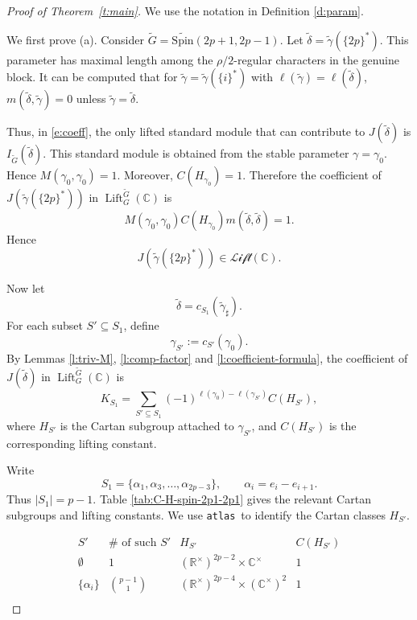 \documentclass{amsart}
\DeclareMathOperator{\Lift}{Lift}
\newcommand{\LLift}{\mathscr{Lift}}
\newcommand{\atlas}{\texttt{atlas}}
\newcommand{\bbC}{{\mathbb{C}}}
\newcommand{\bbR}{{\mathbb R}}
\newcommand{\Spin}{{\mathrm{Spin}}}
\theoremstyle{definition}
\newcommand{\tu}{\widetilde}
\begin{document}
\begin{proof}[Proof of Theorem~\ref{t:main}]
We use the notation in Definition \ref{d:param}.

We first prove (a). Consider $\tu G =\tu\Spin(2p+1,2p-1)$. 
Let
$\tu\delta=\tu\gamma(\{2p\}^*)$.  This parameter has maximal length among the $\rho/2$-regular characters in the
genuine block.  It can be computed that for $\tu\gamma=\tu\gamma(\{i\}^*)$ with $\ell(\tu\gamma)=\ell (\tu\delta)$, $m(\tu\delta,\tu\gamma)=0$ unless $\tu\gamma=\tu\delta$. 




Thus, in \eqref{e:coeff}, the only lifted standard module that can contribute
to $J(\tu\delta)$ is $I_{\tu G}(\tu\delta)$. This standard module is obtained
from the stable parameter $\gamma=\gamma_0$. Hence
$M(\gamma_0,\gamma_0)=1.$
Moreover, 
$C(H_{\gamma_0})=1.$
Therefore the coefficient of
$J(\tu\gamma(\{2p\}^*))$ in $\Lift_G^{\tu G}(\bbC)$ is $$M(\gamma_0,\gamma_0)C(H_{\gamma_0})m(\tu\delta,\tu\delta)=
1.$$
Hence
$$
J(\tu\gamma(\{2p\}^*))
\in \LLift(\bbC).
$$



Now let
\[
\tu\delta=c_{S_1}(\tu\gamma_\sharp).
\]
For each subset \(S'\subseteq S_1\), define
\[
\gamma_{S'}:=c_{S'}(\gamma_0).
\]
By Lemmas \ref{l:triv-M}, \ref{l:comp-factor} and \ref{l:coefficient-formula}, the coefficient of
\(J(\tu\delta)\) in \(\Lift_G^{\tu G}(\bbC)\) is
\begin{equation}\label{e:coeff1}
K_{S_1}
=
\sum_{S'\subseteq S_1}
(-1)^{\ell(\gamma_0)-\ell(\gamma_{S'})}
C(H_{S'}),
\end{equation}
where \(H_{S'}\) is the Cartan subgroup attached to \(\gamma_{S'}\), and
\(C(H_{S'})\) is the corresponding lifting constant.

Write
\[
S_1=\{\alpha_1,\alpha_3,\ldots,\alpha_{2p-3}\},
\qquad
\alpha_i=e_i-e_{i+1}.
\]
Thus \(|S_1|=p-1\). Table \ref{tab:C-H-spin-2p1-2p1} gives the relevant Cartan subgroups and
lifting constants. We use \atlas\ to identify the Cartan classes \(H_{S'}\).

\begin{table}[!htbp]
\centering
\renewcommand{\arraystretch}{1.35}
\[
\begin{array}{c|c|c|c}
S' & \#\text{ of such }S' & H_{S'} & C(H_{S'}) \\
\hline
\emptyset
&
1
&
(\bbR^\times)^{2p-2}\times \bbC^\times
&
1
\\

\{\alpha_i\}
&
{p-1\choose 1}
&
(\bbR^\times)^{2p-4}\times(\bbC^\times)^2
&
1
\\


\end{array}\]
\end{table}
\end{proof}
\end{document}
